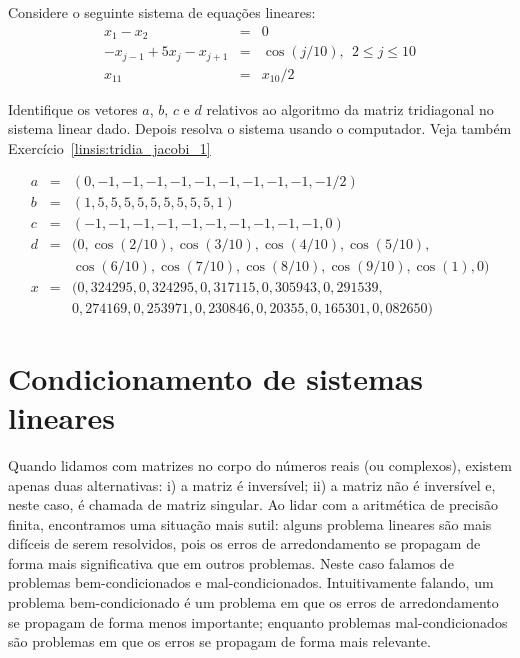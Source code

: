 \begin{exer}\label{linsis:tridia_jacobi_2} Considere o seguinte sistema de equações lineares:
\begin{eqnarray}
x_1-x_2&=&0\nonumber\\
-x_{j-1}+5x_j-x_{j+1}&=&\cos(j/10),~~ 2\leq j \leq 10\nonumber\\
x_{11}&=&x_{10}/2
\end{eqnarray}

Identifique os vetores $a$, $b$, $c$ e $d$  relativos ao algoritmo da matriz tridiagonal no sistema linear dado.  Depois resolva o sistema usando o computador. Veja também Exercício~\ref{linsis:tridia_jacobi_1}
 \end{exer}
\begin{resp}
 \begin{eqnarray*}
  a &=& (0, -1, -1, -1, -1, -1, -1, -1, -1, -1, -1/2)\\
  b &=& (1,  5,  5,  5,  5,  5,  5,  5,  5,  5,  1)\\
  c &=& (-1, -1, -1, -1, -1, -1, -1, -1, -1, -1, 0)\\
  d &=& (0, \cos(2/10), \cos(3/10), \cos(4/10), \cos(5/10),\\&& \cos(6/10), \cos(7/10), \cos(8/10), \cos(9/10), \cos(1) ,0)\\
  x &=& (0,324295, 0,324295, 0,317115, 0,305943, 0,291539,\\&& 0,274169, 0,253971, 0,230846, 0,20355, 0,165301, 0,082650)
 \end{eqnarray*}
\end{resp}



\section{Condicionamento de sistemas lineares}

Quando lidamos com matrizes no corpo do números reais (ou complexos), existem apenas duas alternativas: i) a matriz é inversível; ii) a matriz não é inversível e, neste caso, é chamada de matriz singular. Ao lidar com a aritmética de precisão finita, encontramos uma situação mais sutil: alguns problema lineares são mais difíceis de serem resolvidos, pois os erros de arredondamento se propagam de forma mais significativa que em outros problemas. Neste caso falamos de problemas bem-condicionados e mal-condicionados. Intuitivamente falando, um problema bem-condicionado é um problema em que os erros de arredondamento se propagam de forma menos importante; enquanto problemas mal-condicionados são problemas em que os erros se propagam de forma mais relevante.

